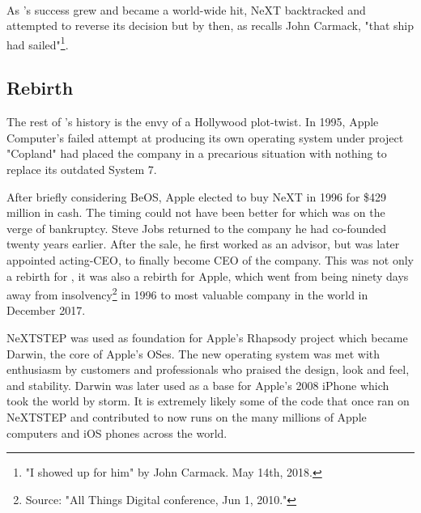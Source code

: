 \\
\par
{}
\par

 As \doom{}'s success grew and became a world-wide hit, NeXT backtracked and attempted to reverse its decision but by then, as recalls John Carmack, "that ship had sailed"\footnote{"I showed up for him" by John Carmack.  May 14th, 2018.}.


\subsection{Rebirth}
The rest of \NeXTns{}'s history is the envy of a Hollywood plot-twist. In 1995, Apple Computer's failed attempt at producing its own operating system under project "Copland" had placed the company in a precarious situation with nothing to replace its outdated System 7.\\
\par
 After briefly considering BeOS, Apple elected to buy NeXT in 1996 for \$429 million in cash. The timing could not have been better for \NeXT which was on the verge of bankruptcy. Steve Jobs returned to the company he had co-founded twenty years earlier. After the sale, he first worked as an advisor, but was later appointed acting-CEO, to finally become CEO of the company. This was not only a rebirth for \NeXTns, it was also a rebirth for Apple, which went from being ninety days away from insolvency\footnote{Source: "All Things Digital conference, Jun 1, 2010."} in 1996 to most valuable company in the world in December 2017. \\
\par
NeXTSTEP was used as foundation for Apple's Rhapsody project which became Darwin, the core of Apple's OSes. The new operating system was met with enthusiasm by customers and professionals who praised the design, look and feel, and stability. Darwin was later used as a base for Apple's 2008 iPhone which took the world by storm. It is extremely likely some of the code that once ran on NeXTSTEP and contributed to \doom{} now runs on the many millions of Apple computers and iOS phones across the world.\\



